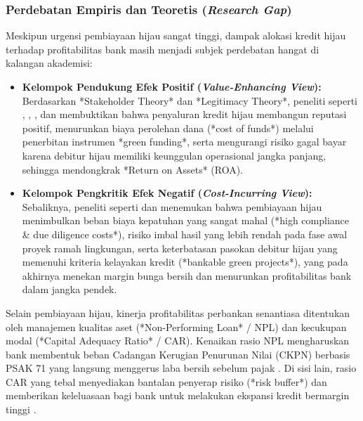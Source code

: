 \documentclass[12pt,a4paper]{article}
\numberwithin{equation}{section}
\begin{document}
\subsubsection*{Perdebatan Empiris dan Teoretis (\emph{Research Gap})}
\noindent
Meskipun urgensi pembiayaan hijau sangat tinggi, dampak alokasi kredit hijau terhadap profitabilitas bank masih menjadi subjek perdebatan hangat di kalangan akademisi:
\begin{itemize}
  \item \textbf{Kelompok Pendukung Efek Positif (\emph{Value-Enhancing View}):} Berdasarkan *Stakeholder Theory* dan *Legitimacy Theory*, peneliti seperti \citet{Pramono2022}, \citet{Yin2021}, \citet{SariAstuti2023}, dan \citet{Sun2021} membuktikan bahwa penyaluran kredit hijau membangun reputasi positif, menurunkan biaya perolehan dana (*cost of funds*) melalui penerbitan instrumen *green funding*, serta mengurangi risiko gagal bayar karena debitur hijau memiliki keunggulan operasional jangka panjang, sehingga mendongkrak *Return on Assets* (ROA).
  \item \textbf{Kelompok Pengkritik Efek Negatif (\emph{Cost-Incurring View}):} Sebaliknya, peneliti seperti \citet{Akomea2022} dan \citet{Zhang2022} menemukan bahwa pembiayaan hijau menimbulkan beban biaya kepatuhan yang sangat mahal (*high compliance \& due diligence costs*), risiko imbal hasil yang lebih rendah pada fase awal proyek ramah lingkungan, serta keterbatasan pasokan debitur hijau yang memenuhi kriteria kelayakan kredit (*bankable green projects*), yang pada akhirnya menekan margin bunga bersih dan menurunkan profitabilitas bank dalam jangka pendek.
\end{itemize}

\noindent
Selain pembiayaan hijau, kinerja profitabilitas perbankan senantiasa ditentukan oleh manajemen kualitas aset (*Non-Performing Loan* / NPL) dan kecukupan modal (*Capital Adequacy Ratio* / CAR). Kenaikan rasio NPL mengharuskan bank membentuk beban Cadangan Kerugian Penurunan Nilai (CKPN) berbasis PSAK 71 yang langsung menggerus laba bersih sebelum pajak \citep{KuncoroSuhardjono2018, PraditaSyaichu2022}. Di sisi lain, rasio CAR yang tebal menyediakan bantalan penyerap risiko (*risk buffer*) dan memberikan keleluasaan bagi bank untuk melakukan ekspansi kredit bermargin tinggi \citep{BrighamEhrhardt2020, LestariPurnomo2023}.
\end{document}

